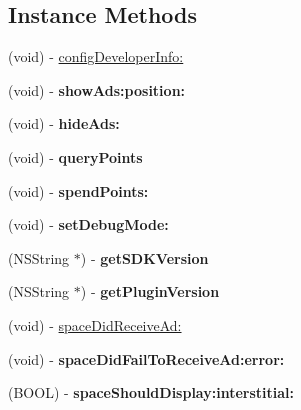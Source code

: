\subsection*{Instance Methods}
\begin{DoxyCompactItemize}
\item 
(void) -\/ \hyperlink{interfaceAdsFlurry_a209033cc0195f245f70255b0f29457aa}{config\+Developer\+Info\+:}
\item 
\mbox{\label{interfaceAdsFlurry_acd72a107cd3301596ce797aa4de608b9}} 
(void) -\/ {\bfseries show\+Ads\+:position\+:}
\item 
\mbox{\label{interfaceAdsFlurry_ad8a673ee188907877b250318f265b25a}} 
(void) -\/ {\bfseries hide\+Ads\+:}
\item 
\mbox{\label{interfaceAdsFlurry_aac92f860ef145727323b8b9d42174371}} 
(void) -\/ {\bfseries query\+Points}
\item 
\mbox{\label{interfaceAdsFlurry_ab74dd324087f2488245bc9e1c8156b2f}} 
(void) -\/ {\bfseries spend\+Points\+:}
\item 
\mbox{\label{interfaceAdsFlurry_ac3a0a79a36f10df0fe1b7f755442cd15}} 
(void) -\/ {\bfseries set\+Debug\+Mode\+:}
\item 
\mbox{\label{interfaceAdsFlurry_aa8a2c0ae87e51391ed11cdd3493745b7}} 
(N\+S\+String $\ast$) -\/ {\bfseries get\+S\+D\+K\+Version}
\item 
\mbox{\label{interfaceAdsFlurry_a89052b8440cb228ac83b2bffc1b8db86}} 
(N\+S\+String $\ast$) -\/ {\bfseries get\+Plugin\+Version}
\item 
(void) -\/ \hyperlink{interfaceAdsFlurry_aec9e59cf1944dfcc9df3dad439730b54}{space\+Did\+Receive\+Ad\+:}
\item 
\mbox{\label{interfaceAdsFlurry_a1d719b2d342cffe281400ef6af3dc0d3}} 
(void) -\/ {\bfseries space\+Did\+Fail\+To\+Receive\+Ad\+:error\+:}
\item 
\mbox{\label{interfaceAdsFlurry_a427c71276624ea127c414414ff389f38}} 
(B\+O\+OL) -\/ {\bfseries space\+Should\+Display\+:interstitial\+:}
\end{DoxyCompactItemize}
